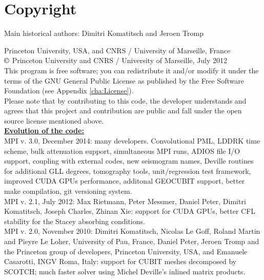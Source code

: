 
\chapter*{Copyright}

Main historical authors: Dimitri Komatitsch and Jeroen Tromp

Princeton University, USA, and CNRS / University of Marseille, France\\
$\copyright$ Princeton University and CNRS / University of Marseille, July 2012\\

\noindent
This program is free software; you can redistribute it and/or modify
it under the terms of the GNU General Public License as published
by the Free Software Foundation (see Appendix \ref{cha:License}).\\

\noindent
Please note that by contributing to this code, the developer understands and agrees that this project and contribution
are public and fall under the open source license mentioned above.\\

\noindent
\textbf{\underline{Evolution of the code:}}\\

MPI v. 3.0, December 2014: many developers.
Convolutional PML, LDDRK time scheme, bulk attenuation support, simultaneous MPI runs,
ADIOS file I/O support, coupling with external codes, new seismogram names,
Deville routines for additional GLL degrees, tomography tools, unit/regression test framework,
improved CUDA GPUs performance, additonal GEOCUBIT support, better make compilation,
git versioning system. \\


MPI v. 2.1, July 2012: Max Rietmann, Peter Messmer, Daniel Peter, Dimitri
Komatitsch, Joseph Charles, Zhinan Xie: support for CUDA GPUs, better
CFL stability for the Stacey absorbing conditions. \\


MPI v. 2.0, November 2010: Dimitri Komatitsch, Nicolas Le Goff, Roland
Martin and Pieyre Le Loher, University of Pau, France, Daniel Peter,
Jeroen Tromp and the Princeton group of developers, Princeton University,
USA, and Emanuele Casarotti, INGV Roma, Italy: support for CUBIT meshes
decomposed by SCOTCH; much faster solver using Michel Deville's inlined
matrix products.\\


